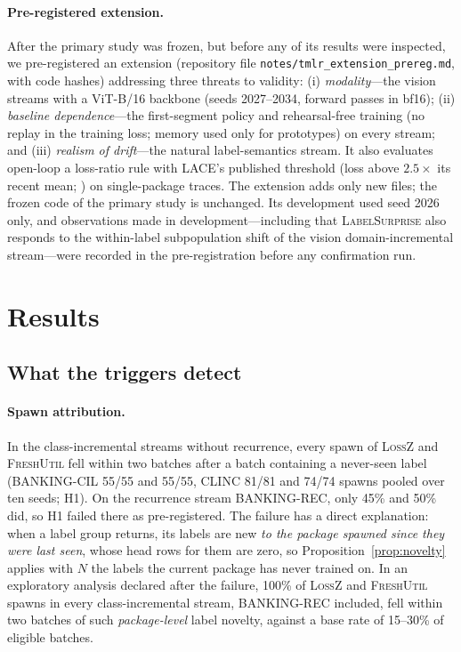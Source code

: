 \documentclass[10pt]{article}
\newcommand{\ls}{\textsc{LabelSurprise}}
\begin{document}
\paragraph{Pre-registered extension.}
\label{sec:extension}
After the primary study was frozen, but before any of its results were inspected, we pre-registered an extension (repository file \texttt{notes/tmlr\_extension\_prereg.md}, with code hashes) addressing three threats to validity: (i) \emph{modality}---the vision streams with a ViT-B/16 backbone (seeds 2027--2034, forward passes in bf16); (ii) \emph{baseline dependence}---the first-segment policy and rehearsal-free training (no replay in the training loss; memory used only for prototypes) on every stream; and (iii) \emph{realism of drift}---the natural label-semantics stream. It also evaluates open-loop a loss-ratio rule with LACE's published threshold (loss above $2.5\times$ its recent mean; \citealp{tathe2026lace}) on single-package traces. The extension adds only new files; the frozen code of the primary study is unchanged. Its development used seed 2026 only, and observations made in development---including that \ls{} also responds to the within-label subpopulation shift of the vision domain-incremental stream---were recorded in the pre-registration before any confirmation run.

\section{Results}
\label{sec:results}



\subsection{What the triggers detect}
\label{sec:res-detect}
\paragraph{Spawn attribution.} In the class-incremental streams without recurrence, every spawn of \textsc{LossZ} and \textsc{FreshUtil} fell within two batches after a batch containing a never-seen label (BANKING-CIL 55/55 and 55/55, CLINC 81/81 and 74/74 spawns pooled over ten seeds; H1). On the recurrence stream BANKING-REC, only 45\% and 50\% did, so H1 failed there as pre-registered. The failure has a direct explanation: when a label group returns, its labels are new \emph{to the package spawned since they were last seen}, whose head rows for them are zero, so Proposition~\ref{prop:novelty} applies with $N$ the labels the current package has never trained on. In an exploratory analysis declared after the failure, 100\% of \textsc{LossZ} and \textsc{FreshUtil} spawns in every class-incremental stream, BANKING-REC included, fell within two batches of such \emph{package-level} label novelty, against a base rate of 15--30\% of eligible batches.
\end{document}
